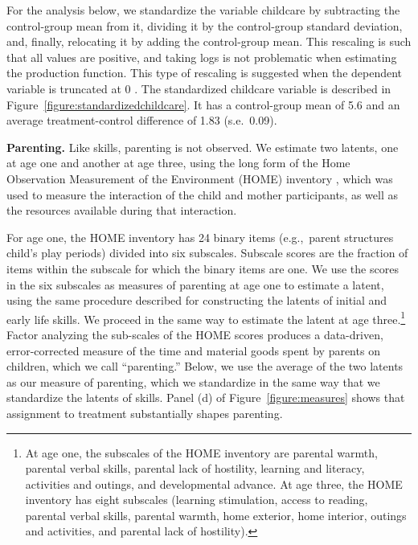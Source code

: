For the analysis below, we standardize the variable childcare by subtracting the control-group mean from it, dividing it by the control-group standard deviation, and, finally, relocating it by adding the control-group mean. This rescaling is such that all values are positive, and taking logs is not problematic when estimating the production function. This type of rescaling is suggested when the dependent variable is truncated at 0 \citep{chenLogsZerosProblems2024}. The standardized childcare variable is described in Figure~\ref{figure:standardizedchildcare}. It has a control-group mean of 5.6 and an average treatment-control difference of 1.83 (s.e.\ 0.09).

\noindent \textbf{Parenting.} Like skills, parenting is not observed. We estimate two latents, one at age one and another at age three, using the long form of the Home Observation Measurement of the Environment (HOME) inventory \citep{bradley1992home,bradley1984home}, which was used to measure the interaction of the child and mother participants, as well as the resources available during that interaction. %

For age one, the HOME inventory has 24 binary items (e.g.,\ parent structures child's play periods) divided into six subscales. Subscale scores are the fraction of items within the subscale for which the binary items are one. We use the scores in the six subscales as measures of parenting at age one to estimate a latent, using the same procedure described for constructing the latents of initial and early life skills. We proceed in the same way to estimate the latent at age three.\footnote{At age one, the subscales of the HOME inventory are parental warmth, parental verbal skills, parental lack of hostility, learning and literacy, activities and outings, and developmental advance. At age three, the HOME inventory has eight subscales (learning stimulation, access to reading, parental verbal skills, parental warmth, home exterior, home interior, outings and activities, and parental lack of hostility).} Factor analyzing the sub-scales of the HOME scores produces a data-driven, error-corrected measure of the time and material goods spent by parents on children, which we call ``parenting.'' Below, we use the average of the two latents as our measure of parenting, which we standardize in the same way that we standardize the latents of skills. Panel (d) of Figure~\ref{figure:measures} shows that assignment to treatment substantially shapes parenting.

